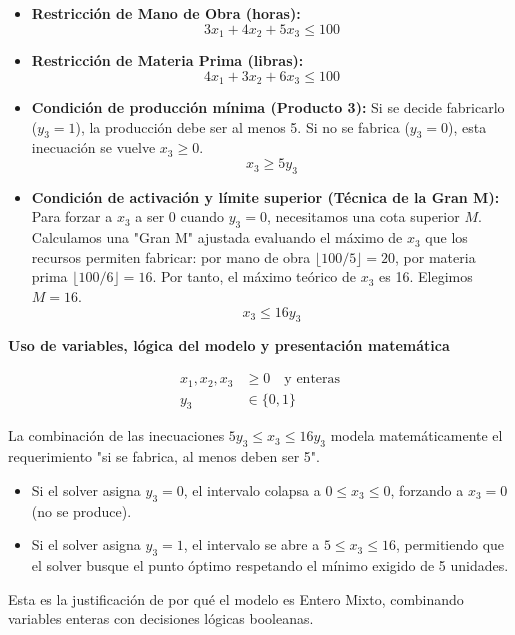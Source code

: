 \documentclass[10pt,a4paper]{article}
\begin{document}
\begin{itemize}
    \item \textbf{Restricción de Mano de Obra (horas):} 
    \[ 3x_1 + 4x_2 + 5x_3 \le 100 \]

    \item \textbf{Restricción de Materia Prima (libras):} 
    \[ 4x_1 + 3x_2 + 6x_3 \le 100 \]

    \item \textbf{Condición de producción mínima (Producto 3):} Si se decide fabricarlo ($y_3 = 1$), la producción debe ser al menos 5. Si no se fabrica ($y_3 = 0$), esta inecuación se vuelve $x_3 \ge 0$.
    \[ x_3 \ge 5y_3 \]

    \item \textbf{Condición de activación y límite superior (Técnica de la Gran M):} Para forzar a $x_3$ a ser 0 cuando $y_3 = 0$, necesitamos una cota superior $M$. Calculamos una "Gran M" ajustada evaluando el máximo de $x_3$ que los recursos permiten fabricar: por mano de obra $\lfloor 100/5 \rfloor = 20$, por materia prima $\lfloor 100/6 \rfloor = 16$. Por tanto, el máximo teórico de $x_3$ es 16. Elegimos $M = 16$.
    \[ x_3 \le 16y_3 \]
\end{itemize}

\vspace{3mm}
\textbf{Uso de variables, lógica del modelo y presentación matemática}

\begin{align*}
    x_1, x_2, x_3 &\ge 0 \quad \text{y enteras} \\
    y_3 &\in \{0, 1\}
\end{align*}

\begin{nota}{}
La combinación de las inecuaciones $5y_3 \le x_3 \le 16y_3$ modela matemáticamente el requerimiento "si se fabrica, al menos deben ser 5". 
\begin{itemize}
    \item Si el solver asigna $y_3 = 0$, el intervalo colapsa a $0 \le x_3 \le 0$, forzando a $x_3 = 0$ (no se produce).
    \item Si el solver asigna $y_3 = 1$, el intervalo se abre a $5 \le x_3 \le 16$, permitiendo que el solver busque el punto óptimo respetando el mínimo exigido de 5 unidades.
\end{itemize}
Esta es la justificación de por qué el modelo es Entero Mixto, combinando variables enteras con decisiones lógicas booleanas.
\end{nota}
\end{document}
